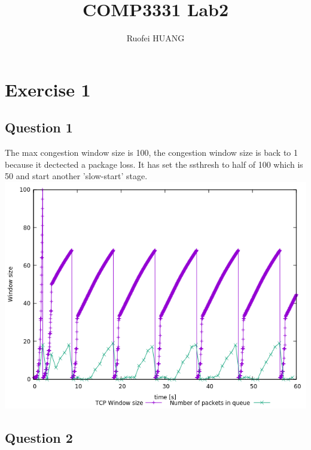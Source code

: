 \documentclass{article}
\begin{document}
\title{COMP3331 Lab2}
\author{Ruofei HUANG}

\maketitle

\section{Exercise 1}

\subsection{Question 1}

The max congestion window size is 100, the congestion window size is back to 1
because it dectected a package loss. It has set the ssthresh to half of 100 which is 50 and start another 'slow-start' stage. \\
\includegraphics[width=\textwidth]{ex1q1.png}

\subsection{Question 2}
\end{document}
